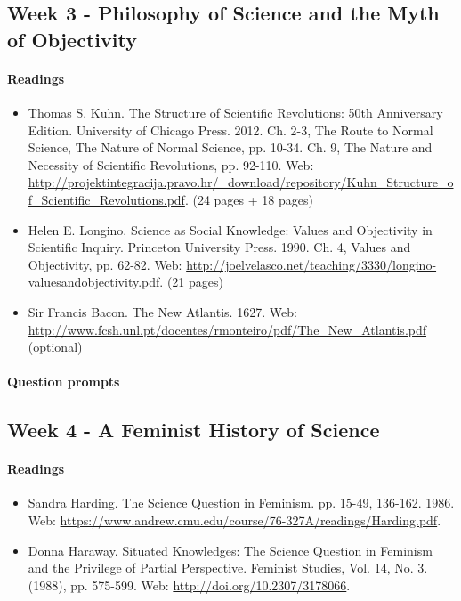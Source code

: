 \documentclass{article}
\begin{document}
\subsection{Week 3 - Philosophy of Science and the Myth of Objectivity}
\paragraph{Readings}
\begin{itemize}
\item Thomas S. Kuhn. The Structure of Scientific Revolutions: 50th Anniversary Edition. University of Chicago Press. 2012. Ch. 2-3, The Route to Normal Science, The Nature of Normal Science, pp. 10-34. Ch. 9, The Nature and Necessity of Scientific Revolutions, pp. 92-110. Web: \url{http://projektintegracija.pravo.hr/_download/repository/Kuhn_Structure_of_Scientific_Revolutions.pdf}. (24 pages + 18 pages)
\item Helen E. Longino. Science as Social Knowledge: Values and Objectivity in Scientific Inquiry. Princeton University Press. 1990. Ch. 4, Values and Objectivity, pp. 62-82. Web: \url{http://joelvelasco.net/teaching/3330/longino-valuesandobjectivity.pdf}. (21 pages)
\item Sir Francis Bacon. The New Atlantis. 1627. Web: \url{http://www.fcsh.unl.pt/docentes/rmonteiro/pdf/The_New_Atlantis.pdf} (optional)
\end{itemize}
\paragraph{Question prompts}


\subsection{Week 4 - A Feminist History of Science}
\paragraph{Readings}
\begin{itemize}
\item Sandra Harding. The Science Question in Feminism. pp. 15-49, 136-162. 1986. Web: \url{https://www.andrew.cmu.edu/course/76-327A/readings/Harding.pdf}.
\item Donna Haraway. Situated Knowledges: The Science Question in Feminism and the Privilege of Partial Perspective. Feminist Studies, Vol. 14, No. 3. (1988), pp. 575-599. Web: \url{http://doi.org/10.2307/3178066}.
\end{itemize}
\end{document}
